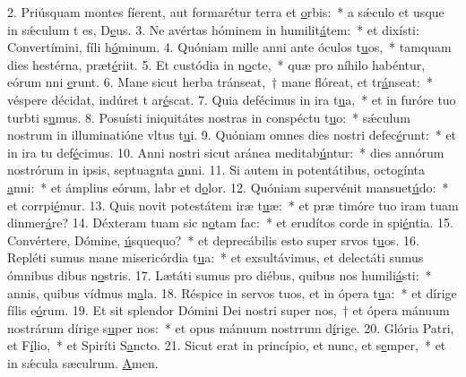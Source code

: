 2. Priúsquam montes fíerent, aut formarétur terra et \uline{o}rbis:~* a sǽculo et usque in sǽculum t es, D\uline{e}us.
3. Ne avértas hóminem in humilit\uline{á}tem:~* et dixísti: Convertímini, fíli h\uline{ó}minum.
4. Quóniam mille anni ante óculos t\uline{u}os,~* tamquam dies hestérna,  præt\uline{é}riit.
5. Et custódia in n\uline{o}cte,~* quæ pro níhilo habéntur, eórum nni \uline{e}runt.
6. Mane sicut herba tránseat,~† mane flóreat, et tr\uline{á}nseat:~* véspere décidat, indúret t ar\uline{é}scat.
7. Quia defécimus in ira t\uline{u}a,~* et in furóre tuo turbti s\uline{u}mus.
8. Posuísti iniquitátes nostras in conspéctu t\uline{u}o:~* sǽculum nostrum in illuminatióne vltus t\uline{u}i.
9. Quóniam omnes dies nostri defec\uline{é}runt:~* et in ira tu def\uline{é}cimus.
10. Anni nostri sicut aránea meditab\uline{ú}ntur:~* dies annórum nostrórum in ipsis, septuagnta \uline{a}nni.
11. Si autem in potentátibus, octogínta \uline{a}nni:~* et ámplius eórum, labr et d\uline{o}lor.
12. Quóniam supervénit mansuet\uline{ú}do:~* et corrpi\uline{é}mur.
13. Quis novit potestátem iræ t\uline{u}æ:~* et præ timóre tuo iram tuam dinmer\uline{á}re?
14. Déxteram tuam sic n\uline{o}tam fac:~* et erudítos corde in spi\uline{é}ntia.
15. Convértere, Dómine, \uline{ú}squequo?~* et deprecábilis esto super srvos t\uline{u}os.
16. Repléti sumus mane misericórdia t\uline{u}a:~* et exsultávimus, et delectáti sumus ómnibus dibus n\uline{o}stris.
17. Lætáti sumus pro diébus, quibus nos humili\uline{á}sti:~* annis, quibus vídmus m\uline{a}la.
18. Réspice in servos tuos, et in ópera t\uline{u}a:~* et dírige fílis e\uline{ó}rum.
19. Et sit splendor Dómini Dei nostri super nos,~† et ópera mánuum nostrárum dírige s\uline{u}per nos:~* et opus mánuum nostrrum d\uline{í}rige.
20. Glória Patri, et F\uline{í}lio,~* et Spiríti S\uline{a}ncto.
21. Sicut erat in princípio, et nunc, et s\uline{e}mper,~* et in sǽcula sæculrum. \uline{A}men.
